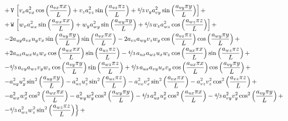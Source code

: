 \documentclass[10pt]{article}
\newcommand{\V}{\,\mathtt{V}}
\newcommand{\W}{\,\mathtt{W}}
\begin{document}
\begin{equation*}
\begin{split}
 &\qquad\left.+ \V \, \left[v_{x} a_{vx}^{2} \cos\left(\frac{a_{vx} \pi x}{L}\right) + v_{z} a_{vz}^{2} \sin\left(\frac{a_{vz} \pi z}{L}\right) + \nicefrac{4}{3} \, v_{y} a_{vy}^{2} \sin\left(\frac{a_{vy} \pi y}{L}\right)\right] +\right.\\
 &\qquad\left.+ \W \, \left[w_{x} a_{wx}^{2} \sin\left(\frac{a_{wx} \pi x}{L}\right) + w_{y} a_{wy}^{2} \sin\left(\frac{a_{wy} \pi y}{L}\right) + \nicefrac{4}{3} \, w_{z} a_{wz}^{2} \cos\left(\frac{a_{wz} \pi z}{L}\right)\right] +\right.\\
 &\qquad\left.- 2 a_{uy} a_{vx} u_{y} v_{x} \sin\left(\frac{a_{uy} \pi y}{L}\right) \sin\left(\frac{a_{vx} \pi x}{L}\right) - 2 a_{vz} a_{wy} v_{z} w_{y} \cos\left(\frac{a_{vz} \pi z}{L}\right) \cos\left(\frac{a_{wy} \pi y}{L}\right) +\right.\\
 &\qquad\left.+ 2 a_{uz} a_{wx} u_{z} w_{x} \cos\left(\frac{a_{wx} \pi x}{L}\right) \sin\left(\frac{a_{uz} \pi z}{L}\right) - \nicefrac{4}{3} \, a_{ux} a_{wz} u_{x} w_{z} \cos\left(\frac{a_{ux} \pi x}{L}\right) \sin\left(\frac{a_{wz} \pi z}{L}\right) +\right.\\
 &\qquad\left.- \nicefrac{4}{3} \, a_{vy} a_{wz} v_{y} w_{z} \cos\left(\frac{a_{vy} \pi y}{L}\right) \sin\left(\frac{a_{wz} \pi z}{L}\right) + \nicefrac{4}{3} \, a_{ux} a_{vy} u_{x} v_{y} \cos\left(\frac{a_{ux} \pi x}{L}\right) \cos\left(\frac{a_{vy} \pi y}{L}\right) +\right.\\
 &\qquad\left.- a_{uy}^{2} u_{y}^{2} \sin^{2}\left(\frac{a_{uy} \pi y}{L}\right) - a_{uz}^{2} u_{z}^{2} \sin^{2}\left(\frac{a_{uz} \pi z}{L}\right) - a_{vx}^{2} v_{x}^{2} \sin^{2}\left(\frac{a_{vx} \pi x}{L}\right) - a_{vz}^{2} v_{z}^{2} \cos^{2}\left(\frac{a_{vz} \pi z}{L}\right) +\right.\\
 &\qquad\left.- a_{wx}^{2} w_{x}^{2} \cos^{2}\left(\frac{a_{wx} \pi x}{L}\right) - a_{wy}^{2} w_{y}^{2} \cos^{2}\left(\frac{a_{wy} \pi y}{L}\right) - \nicefrac{4}{3} \, a_{ux}^{2} u_{x}^{2} \cos^{2}\left(\frac{a_{ux} \pi x}{L}\right) - \nicefrac{4}{3} \, a_{vy}^{2} v_{y}^{2} \cos^{2}\left(\frac{a_{vy} \pi y}{L}\right) +\right.\\
 &\qquad\left.- \nicefrac{4}{3} \, a_{wz}^{2} w_{z}^{2} \sin^{2}\left(\frac{a_{wz} \pi z}{L}\right)\right\} +\\
%
 \end{split}
\end{equation*}
\end{document}
